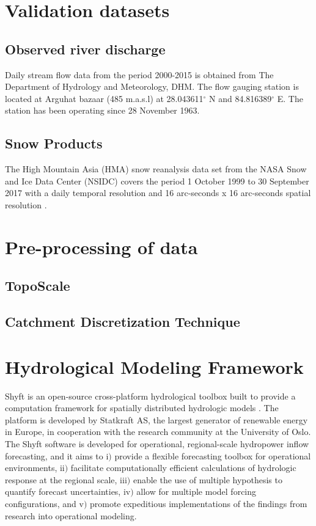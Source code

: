 \section{Validation datasets}

\subsection{Observed river discharge} 

Daily stream flow data from the period 2000-2015 is obtained from The Department of Hydrology and Meteorology, DHM. The  flow gauging station is located at Arguhat bazaar (485 m.a.s.l) at 28.043611$^{\circ}$ N and 84.816389$^{\circ}$ E. The station has been operating since 28 November 1963. 

\subsection{Snow Products}

The High Mountain Asia (HMA) snow reanalysis data set from the NASA Snow and Ice Data Center (NSIDC) covers the period 1 October 1999 to 30 September 2017 with a daily temporal resolution and 16 arc-seconds x 16 arc-seconds spatial resolution \autocite{margulisHighMountainAsia2021}. 


\section{Pre-processing of data}

\subsection{TopoScale}

\subsection{Catchment Discretization Technique}


\section{Hydrological Modeling Framework}


Shyft is an open-source cross-platform hydrological toolbox built to provide a computation framework for spatially distributed hydrologic models \autocite{burkhartShyftV4Framework2021}. The platform is developed by Statkraft AS, the largest generator of renewable energy in Europe, in cooperation with the research community at the University of Oslo. The Shyft software is developed for operational, regional-scale hydropower inflow forecasting, and it aims to i$)$ provide a flexible forecasting toolbox for operational environments, ii$)$ facilitate computationally efficient calculations of hydrologic response at the regional scale, iii$)$ enable the use of multiple hypothesis to quantify forecast uncertainties, iv$)$ allow for multiple model forcing configurations, and v$)$ promote expeditious implementations of the findings from research into operational modeling. 

